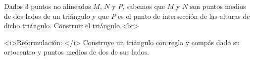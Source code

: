 Dados $3$ puntos no alineados $M$, $N$ y $P$, sabemos que $M$ y $N$ son puntos medios de dos lados de un triángulo y que $P$ es el punto de intersección de las alturas de dicho triángulo. Construir el triángulo.<br>

<i>Reformulación: </i> Construye un triángulo con regla y compás dado su ortocentro y puntos medios de dos de sus lados.